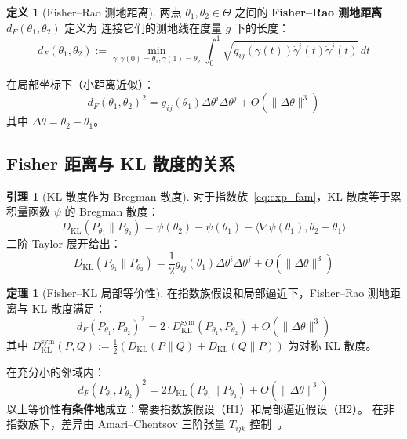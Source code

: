\documentclass[12pt,a4paper]{article}
\theoremstyle{definition}
\newtheorem{definition}{定义}[section]
\newtheorem{theorem}{定理}[section]
\newtheorem{lemma}{引理}[section]
\theoremstyle{remark}
\newcommand{\Fisher}{g}
\newcommand{\KL}{D_{\text{KL}}}
\newcommand{\KLsym}{D_{\text{KL}}^{\text{sym}}}
\begin{document}
\begin{definition}[Fisher--Rao 测地距离]
两点 $\theta_1, \theta_2 \in \Theta$ 之间的 \textbf{Fisher--Rao 测地距离} $d_F(\theta_1, \theta_2)$ 定义为
连接它们的测地线在度量 $\Fisher$ 下的长度：
\begin{equation}
    d_F(\theta_1, \theta_2) := \min_{\gamma: \gamma(0)=\theta_1, \gamma(1)=\theta_2}
    \int_0^1 \sqrt{\Fisher_{ij}(\gamma(t)) \dot{\gamma}^i(t) \dot{\gamma}^j(t)} \, dt \label{eq:geodesic}
\end{equation}
\end{definition}

在局部坐标下（小距离近似）：
\begin{equation}
    d_F(\theta_1, \theta_2)^2 = \Fisher_{ij}(\theta_1) \Delta\theta^i \Delta\theta^j + O(\|\Delta\theta\|^3) \label{eq:local_geodesic}
\end{equation}
其中 $\Delta\theta = \theta_2 - \theta_1$。

\subsection{Fisher 距离与 KL 散度的关系}

\begin{lemma}[KL 散度作为 Bregman 散度]\label{lem:kl_bregman}
对于指数族~\eqref{eq:exp_fam}，KL 散度等于累积量函数 $\psi$ 的 Bregman 散度：
\begin{equation}
    \KL(P_{\theta_1} \| P_{\theta_2}) = \psi(\theta_2) - \psi(\theta_1) - \langle \nabla\psi(\theta_1), \theta_2 - \theta_1 \rangle \label{eq:kl_bregman}
\end{equation}
二阶 Taylor 展开给出：
\begin{equation}
    \KL(P_{\theta_1} \| P_{\theta_2}) = \frac{1}{2} \Fisher_{ij}(\theta_1) \Delta\theta^i \Delta\theta^j + O(\|\Delta\theta\|^3) \label{eq:kl_taylor}
\end{equation}
\end{lemma}

\begin{theorem}[Fisher--KL 局部等价性]\label{thm:fisher_kl}
在指数族假设和局部逼近下，Fisher--Rao 测地距离与 KL 散度满足：
\begin{equation}
    d_F(P_{\theta_1}, P_{\theta_2})^2 = 2 \cdot \KLsym(P_{\theta_1}, P_{\theta_2}) + O(\|\Delta\theta\|^3) \label{eq:fisher_kl_eq}
\end{equation}
其中 $\KLsym(P, Q) := \frac{1}{2}(\KL(P\|Q) + \KL(Q\|P))$ 为对称 KL 散度。

在充分小的邻域内：
\begin{equation}
    d_F(P_{\theta_1}, P_{\theta_2})^2 = 2\KL(P_{\theta_1} \| P_{\theta_2}) + O(\|\Delta\theta\|^3) \label{eq:fisher_kl_asym}
\end{equation}
以上等价性\textbf{有条件地}成立：需要指数族假设（H1）和局部逼近假设（H2）。
在非指数族下，差异由 Amari--Chentsov 三阶张量 $T_{ijk}$ 控制~\cite{amari2016information,scx_gauge_formalized}。
\end{theorem}
\end{document}
